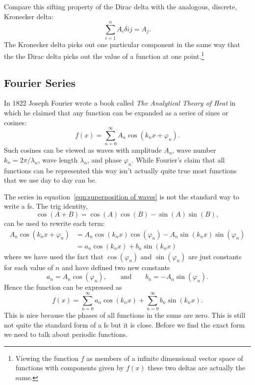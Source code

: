\documentclass[a4paper]{article}
\begin{document}
    Compare this sifting property of the Dirac delta with the analogous, discrete, Kronecker delta:
    \[\sum_{i=1}^n A_i\delta{ij} = A_j.\]
    The Kronecker delta picks out one particular component in the same way that the the Dirac delta picks out the value of a function at one point.\footnote{Viewing the function \(f\) as members of a infinite dimensional vector space of functions with components given by \(f(x)\) these two deltas are actually the same.}
    
    \subsection{Fourier Series}
    In 1822 Joseph Fourier wrote a book called \textit{The Analytical Theory of Heat} in which he claimed that any function can be expanded as a series of sines or cosines:
    \begin{equation}\label{eqn:superposition of waves}
        f(x) = \sum_{n = 0}^\infty A_n\cos(k_nx + \varphi_n).
    \end{equation}
    Such cosines can be viewed as waves with amplitude \(A_n\), wave number \(k_n = 2\pi/\lambda_n\), wave length \(\lambda_n\), and phase \(\varphi_n\).
    While Fourier's claim that all functions can be represented this way isn't actually quite true most functions that we use day to day can be.
    
    The series in equation~\ref{eqn:superposition of waves} is not the standard way to write a \acrfull{fs}.
    The trig identity,
    \[\cos(A + B) = \cos(A)\cos(B) - \sin(A)\sin(B),\]
    can be used to rewrite each term:
    \begin{align*}
        A_n\cos(k_nx + \varphi_n) &= A_n\cos(k_nx)\cos(\varphi_n) - A_n\sin(k_nx)\sin(\varphi_n)\\
        &= a_n\cos(k_nx) + b_n\sin(k_nx)
    \end{align*}
    where we have used the fact that \(\cos(\varphi_n)\) and \(\sin(\varphi_n)\) are just constants for each value of \(n\) and have defined two new constants
    \[a_n = A_n\cos(\varphi_n),\qquad\text{and}\qquad b_n = -A_n\sin(\varphi_n).\]
    Hence the function can be expressed as
    \[f(x) = \sum_{n=0}^\infty a_n\cos(k_nx) + \sum_{n=0}^\infty b_n\sin(k_nx).\]
    This is nice because the phases of all functions in the sums are zero.
    This is still not quite the standard form of a \acrshort{fs} but it is close.
    Before we find the exact form we need to talk about periodic functions.
    
\end{document}
